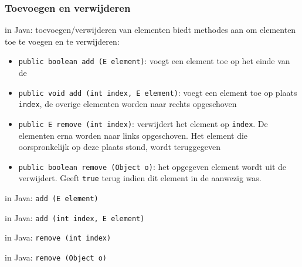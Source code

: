 \subsubsection{Toevoegen en verwijderen}
\begin{frame}[fragile]{\dsarraylist{} in Java: toevoegen/verwijderen van elementen}
\dsarraylist{} biedt methodes aan om elementen toe te voegen en te verwijderen:
\small{\begin{itemize}
 \item \texttt{public boolean add (E element)}: voegt een element toe op het einde van de \dsarraylist{}
 \item \texttt{public void add (int index, E element)}: voegt een element toe op plaats \texttt{index}, de overige elementen worden naar rechts opgeschoven
 \item \texttt{public E remove (int index)}: verwijdert het element op \texttt{index}. De elementen erna worden naar links opgeschoven. Het element die oorspronkelijk op deze plaats stond, wordt teruggegeven
 \item \texttt{public boolean remove (Object o)}: het opgegeven element wordt uit de \dsarraylist{} verwijdert. Geeft \texttt{true} terug indien dit element in de \dsarraylist{} aanwezig was.
\end{itemize}}
\end{frame}
\begin{frame}[fragile]{\dsarraylist{} in Java: \texttt{add (E element)}}
\begin{methodexample}
\begin{center}
\begin{animateinline}[poster=first,controls]{1}
\end{animateinline}
\end{center}
\end{methodexample}
\end{frame}
\begin{frame}[fragile]{\dsarraylist{} in Java: \texttt{add (int index, E element)}}
\begin{methodexample}

\end{methodexample}
\end{frame}
\begin{frame}[fragile]{\dsarraylist{} in Java: \texttt{remove (int index)}}
\begin{methodexample}

\end{methodexample}
\end{frame}
\begin{frame}[fragile]{\dsarraylist{} in Java: \texttt{remove (Object o)}}
\begin{methodexample}

\end{methodexample}
\end{frame}
